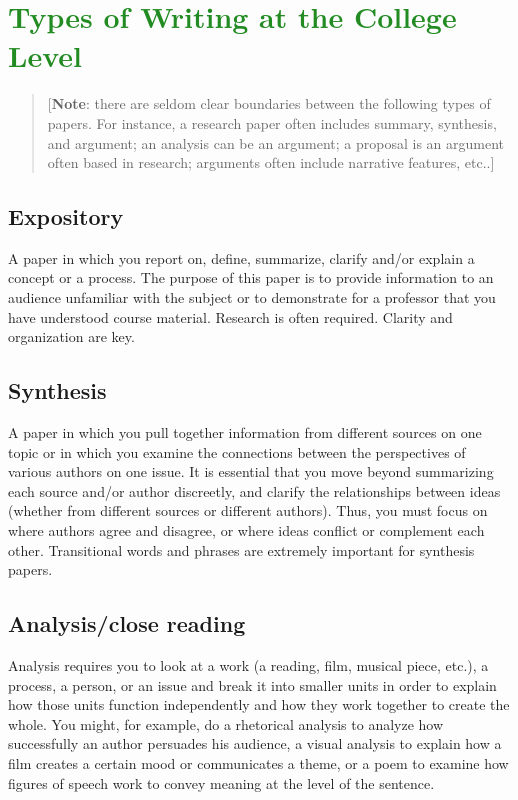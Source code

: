 

\section{\textcolor{ForestGreen}{Types of Writing at the College Level}}

\begin{quote} [\textbf{Note}: there are seldom clear boundaries between the following types of papers. For instance, a research paper often includes summary, synthesis, and argument; an analysis can be an argument; a proposal is an argument often based in research; arguments often include narrative features, etc..] \end{quote}


\subsection{Expository}
A paper in which you report on, define, summarize, clarify and/or explain a concept or a process. The purpose of this paper is to provide information to an audience unfamiliar with the subject or to demonstrate for a professor that you have understood course material.  Research is often required. Clarity and organization are key.

\subsection{Synthesis}

A paper in which you pull together information from different sources on one topic or in which you examine the connections between the perspectives of various authors on one issue. It is essential that you move beyond summarizing each source and/or author discreetly, and clarify the relationships between ideas (whether from different sources or different authors). Thus, you must focus on where authors agree and disagree, or where ideas conflict or complement each other. Transitional words and phrases are extremely important for synthesis papers.

\subsection{Analysis/close reading}
Analysis requires you to look at a work (a reading, film, musical piece, etc.), a process, a person, or an issue and break it into smaller units in order to explain how those units function independently and how they work together to create the whole. You might, for example, do a rhetorical analysis to analyze how successfully an author persuades his audience, a visual analysis to explain how a film creates a certain mood or communicates a theme, or a poem to examine how figures of speech work to convey meaning at the level of the sentence.

